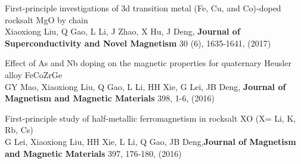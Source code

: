\documentclass[11pt,a4paper,sans]{moderncv} %
\begin{document}
\begin{etaremune}
  \item First-principle investigations of 3d transition metal (Fe, Cu, and Co)-doped rocksalt MgO by chain\\ \textcolor{cvblue}{Xiaoxiong Liu}, Q Gao, L Li, J Zhao, X Hu, J Deng, \textbf{Journal of Superconductivity and Novel Magnetism} 30 (6), 1635-1641, (2017)
  \item Effect of As and Nb doping on the magnetic properties for quaternary Heusler alloy FeCoZrGe\\ GY Mao, \textcolor{cvblue}{Xiaoxiong Liu}, Q Gao, L Li, HH Xie, G Lei, JB Deng, \textbf{Journal of Magnetism and Magnetic Materials} 398, 1-6, (2016)
  \item First-principle study of half-metallic ferromagnetism in rocksalt XO (X= Li, K, Rb, Cs)\\ G Lei, \textcolor{cvblue}{Xiaoxiong Liu}, HH Xie, L Li, Q Gao, JB Deng,\textbf{Journal of Magnetism and Magnetic Materials} 397, 176-180, (2016)

\end{etaremune}









\end{document}
